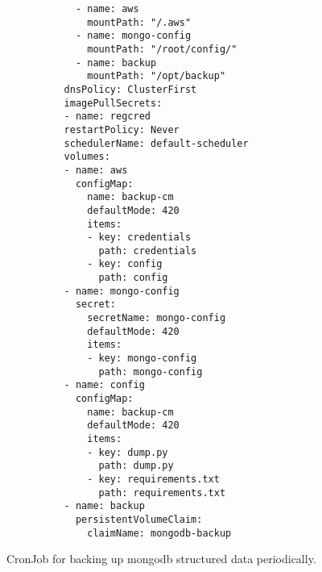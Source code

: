 \begin{code}
\begin{verbatim}
            - name: aws
              mountPath: "/.aws"
            - name: mongo-config
              mountPath: "/root/config/"
            - name: backup
              mountPath: "/opt/backup"
          dnsPolicy: ClusterFirst
          imagePullSecrets:
          - name: regcred
          restartPolicy: Never
          schedulerName: default-scheduler
          volumes:
          - name: aws
            configMap:
              name: backup-cm
              defaultMode: 420
              items:
              - key: credentials
                path: credentials
              - key: config
                path: config
          - name: mongo-config
            secret:
              secretName: mongo-config
              defaultMode: 420
              items:
              - key: mongo-config
                path: mongo-config
          - name: config
            configMap:
              name: backup-cm
              defaultMode: 420
              items:
              - key: dump.py
                path: dump.py
              - key: requirements.txt
                path: requirements.txt
          - name: backup
            persistentVolumeClaim:
              claimName: mongodb-backup
\end{verbatim}
\caption[]{CronJob for backing up mongodb structured data periodically.}
\end{code}
